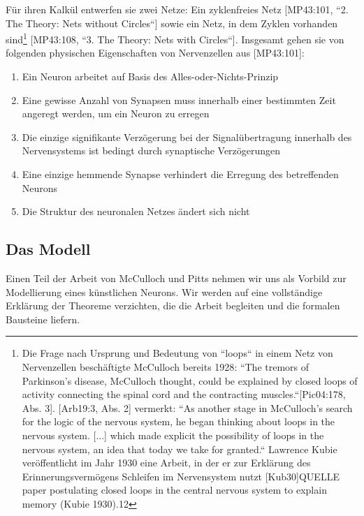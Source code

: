 Für ihren Kalkül entwerfen sie zwei Netze: Ein zyklenfreies Netz [MP43:101, ``2. The Theory: Nets without Circles``] sowie ein Netz, in dem Zyklen vorhanden sind\footnote{
    Die Frage nach Ursprung und Bedeutung von ``loops`` in einem Netz von Nervenzellen beschäftigte McCulloch bereits 1928: ``The tremors of Parkinson’s disease, McCulloch thought, could be explained by closed loops of activity connecting the spinal cord and the contracting muscles.``[Pic04:178, Abs. 3]. [Arb19:3, Abs. 2] vermerkt:  ``As another stage in McCulloch's search for the logic of the nervous system, he began thinking about loops in the nervous system. [...] which made explicit the possibility of loops in the nervous system, an idea that today we take for granted.`` Lawrence Kubie veröffentlicht im Jahr 1930 eine Arbeit, in der er zur Erklärung des Erinnerungsvermögens Schleifen im Nervensystem nutzt [Kub30]QUELLE
    paper postulating closed loops in the central nervous system to explain memory (Kubie 1930).12
} [MP43:108, ``3. The Theory: Nets with Circles``]. Insgesamt gehen sie von folgenden physischen Eigenschaften von Nervenzellen aus [MP43:101]:


\begin{enumerate}
    \item Ein Neuron arbeitet auf Basis des Alles-oder-Nichts-Prinzip
    \item Eine gewisse Anzahl von Synapsen muss innerhalb einer bestimmten Zeit angeregt werden, um ein Neuron zu erregen
    \item Die einzige signifikante Verzögerung bei der Signalübertragung innerhalb des Nervensystems ist bedingt durch synaptische Verzögerungen
    \item Eine einzige hemmende Synapse verhindert die Erregung des betreffenden Neurons
    \item Die Struktur des neuronalen Netzes ändert sich nicht
\end{enumerate}


\subsection{Das Modell}

Einen Teil der Arbeit von McCulloch und Pitts nehmen wir uns als Vorbild zur Modellierung eines künstlichen Neurons.
Wir werden auf eine vollständige Erklärung der Theoreme verzichten, die die Arbeit begleiten und die formalen Bausteine liefern.

